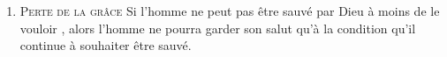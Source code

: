 \begin{enumerate}
  \item \textsc{Perte de la grâce}
\nobreak
Si l'homme ne peut pas être sauvé par Dieu à moins de le vouloir 
 ,
 alors l'homme ne pourra garder son salut qu'à la condition
 qu'il continue à souhaiter être sauvé.

\end{enumerate}




